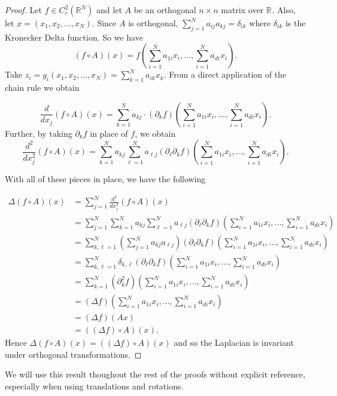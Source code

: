 \begin{proof}
  Let $f \in C_{c}^2(\mathbb{R}^{N} )$ and let $A$ be an orthogonal $n \times n$ matrix over $\mathbb{R}^{} $.
  Also, let $x = (x_1,x_2,\ldots,x_{N})$.
  Since $A$ is orthogonal, $\sum_{j=1}^N a_{ij}a_{kj} = \delta_{ik}$ where $\delta_{ik}$ is the Kronecker Delta function.
  So we have
  \[
    (f \circ A)(x) = f \left( \sum_{i=1}^{N} a_{1i}x_{i}, \ldots , \sum_{i=1}^{N} a_{di}x_{i} \right )
  .\] 
  Take $z_{i} = g_{i}(x_1,x_2,\ldots,x_{N}) = \sum_{k=1}^{N} a_{ik}x_{k}$.
  From a direct application of the chain rule we obtain

  \[
    \frac{d}{dx_j} (f\circ A)(x) = \sum_{k=1}^N a_{kj} \cdot (\partial_k f)( \sum_{i=1}^N a_{1i} x_i, \dots, \sum_{i=1}^N a_{di} x_i ) 
  .\] 
  Further, by taking $\partial_{k} f$ in place of $f$, we obtain
  \[
  \frac{d^2}{dx_j^2} (f\circ A)(x) = \sum_{k=1}^N a_{kj} \sum_{\ell=1}^N a_{\ell j} (\partial_\ell \partial_k f)( \sum_{i=1}^N a_{1i} x_i, \dots, \sum_{i=1}^N a_{di} x_i )
  .\] 

  With all of these pieces in place, we have the following

\begin{align*}
  \Delta (f\circ A)(x) &= \sum_{j=1}^N \frac{d^2}{dx_j^2} (f\circ A)(x) \\
  &= \sum_{j=1}^N \sum_{k=1}^N a_{kj} \sum_{\ell=1}^N a_{\ell j} (\partial_\ell \partial_k f)( \sum_{i=1}^N a_{1i} x_i, \dots, \sum_{i=1}^N a_{di} x_i ) \\
  &= \sum_{k,\ell=1}^N \left( \sum_{j=1}^N a_{kj} a_{\ell j} \right) (\partial_\ell \partial_k f)( \sum_{i=1}^N a_{1i} x_i, \dots, \sum_{i=1}^N a_{di} x_i ) \\
  &= \sum_{k,\ell=1}^N \delta_{k,\ell} (\partial_\ell \partial_k f)( \sum_{i=1}^N a_{1i} x_i, \dots, \sum_{i=1}^N a_{di} x_i ) \\
  &= \sum_{k=1}^N (\partial_k^2 f)( \sum_{i=1}^N a_{1i} x_i, \dots, \sum_{i=1}^N a_{di} x_i ) \\
  &= (\Delta f) ( \sum_{i=1}^N a_{1i} x_i, \dots, \sum_{i=1}^N a_{di} x_i ) \\
  &= (\Delta f)(Ax) \\
  &= ((\Delta f)\circ A)(x).
\end{align*}
  Hence $\Delta (f\circ A)(x) = ((\Delta f)\circ A)(x)$ and so the Laplacian is invariant under orthogonal transformations.
  
\end{proof}

We will use this result thoughout the rest of the proofs without explicit reference, especially when using translations and rotations.



